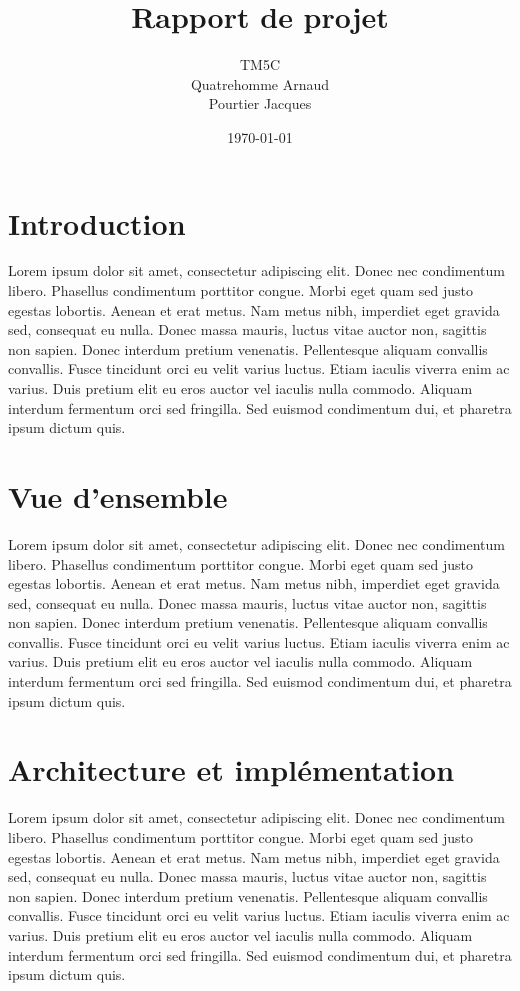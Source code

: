 \documentclass{report}
\begin{document}
\title{Rapport de projet}
\author{TM5C\\
	Quatrehomme Arnaud \\
    Pourtier Jacques}
\date{\today}
\maketitle

\tableofcontents

\chapter{Introduction}
Lorem ipsum dolor sit amet, consectetur adipiscing elit.
Donec nec condimentum libero. Phasellus condimentum porttitor congue.
Morbi eget quam sed justo egestas lobortis. Aenean et erat metus.
Nam metus nibh, imperdiet eget gravida sed, consequat eu nulla. Donec massa mauris, luctus vitae auctor non, sagittis non sapien.
Donec interdum pretium venenatis. Pellentesque aliquam convallis convallis.
Fusce tincidunt orci eu velit varius luctus. Etiam iaculis viverra enim ac varius.
Duis pretium elit eu eros auctor vel iaculis nulla commodo. Aliquam interdum fermentum orci sed fringilla.
Sed euismod condimentum dui, et pharetra ipsum dictum quis.

\chapter{Vue d'ensemble}
Lorem ipsum dolor sit amet, consectetur adipiscing elit.
Donec nec condimentum libero. Phasellus condimentum porttitor congue.
Morbi eget quam sed justo egestas lobortis. Aenean et erat metus.
Nam metus nibh, imperdiet eget gravida sed, consequat eu nulla. Donec massa mauris, luctus vitae auctor non, sagittis non sapien.
Donec interdum pretium venenatis. Pellentesque aliquam convallis convallis.
Fusce tincidunt orci eu velit varius luctus. Etiam iaculis viverra enim ac varius.
Duis pretium elit eu eros auctor vel iaculis nulla commodo. Aliquam interdum fermentum orci sed fringilla.
Sed euismod condimentum dui, et pharetra ipsum dictum quis.

\chapter{Architecture et implémentation}
Lorem ipsum dolor sit amet, consectetur adipiscing elit.
Donec nec condimentum libero. Phasellus condimentum porttitor congue.
Morbi eget quam sed justo egestas lobortis. Aenean et erat metus.
Nam metus nibh, imperdiet eget gravida sed, consequat eu nulla. Donec massa mauris, luctus vitae auctor non, sagittis non sapien.
Donec interdum pretium venenatis. Pellentesque aliquam convallis convallis.
Fusce tincidunt orci eu velit varius luctus. Etiam iaculis viverra enim ac varius.
Duis pretium elit eu eros auctor vel iaculis nulla commodo. Aliquam interdum fermentum orci sed fringilla.
Sed euismod condimentum dui, et pharetra ipsum dictum quis.
\end{document}
